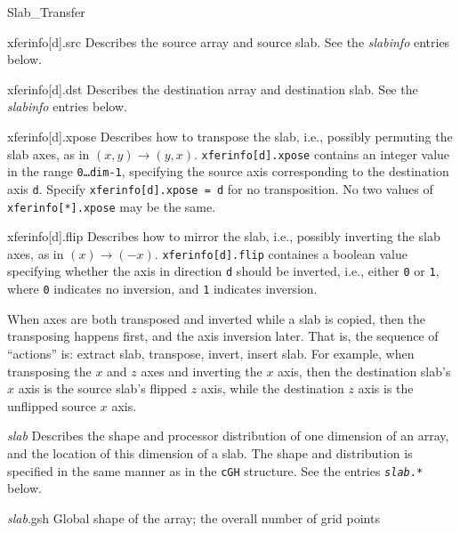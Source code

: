 \begin{FunctionDescription}{Slab\_Transfer}{}
\begin{ParameterSection}
\begin{Parameter}{xferinfo[d].src}
Describes the source array and source slab.  See the \textit{slabinfo}
entries below.
\end{Parameter}

\begin{Parameter}{xferinfo[d].dst}
Describes the destination array and destination slab.  See the
\textit{slabinfo} entries below.
\end{Parameter}

\begin{Parameter}{xferinfo[d].xpose}
Describes how to transpose the slab, i.e., possibly permuting the slab
axes, as in $(x,y) \rightarrow (y,x)$.  \texttt{xferinfo[d].xpose}
contains an integer value in the range \texttt{0\ldots dim-1},
specifying the source axis corresponding to the destination axis
\texttt{d}.  Specify \texttt{xferinfo[d].xpose = d} for no
transposition.  No two values of \texttt{xferinfo[*].xpose} may be the
same.
\end{Parameter}

\begin{Parameter}{xferinfo[d].flip}
Describes how to mirror the slab, i.e., possibly inverting the slab
axes, as in $(x) \rightarrow (-x)$.  \texttt{xferinfo[d].flip}
containes a boolean value specifying whether the axis in direction
\texttt{d} should be inverted, i.e., either \texttt{0} or \texttt{1},
where \texttt{0} indicates no inversion, and \texttt{1} indicates
inversion.

When axes are both transposed and inverted while a slab is copied,
then the transposing happens first, and the axis inversion later.
That is, the sequence of ``actions'' is: extract slab, transpose,
invert, insert slab.  For example, when transposing the $x$ and $z$
axes and inverting the $x$ axis, then the destination slab's $x$ axis
is the source slab's flipped $z$ axis, while the destination $z$ axis
is the unflipped source $x$ axis.
\end{Parameter}

\begin{Parameter}{\textit{slab}}
Describes the shape and processor distribution of one dimension of an
array, and the location of this dimension of a slab.  The shape and
distribution is specified in the same manner as in the \texttt{cGH}
structure.  See the entries \texttt{\textit{slab}.*} below.
\end{Parameter}

\begin{Parameter}{\textit{slab}.gsh}
Global shape of the array; the overall number of grid points
\end{Parameter}


\end{ParameterSection}
\end{FunctionDescription}
